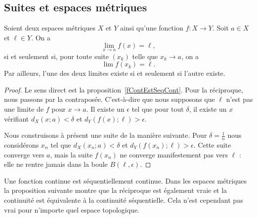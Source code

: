 \subsection{Suites et espaces métriques}


\begin{proposition}     \label{PROPooJYOOooZWocoq}
	Soient deux espaces métriques \( X\) et \( Y\) ainsi qu'une fonction \( f\colon X\to Y\). Soit \( a\in X\) et \( \ell\in Y\). On a
	\begin{equation}\label{EqLimooJYOOooZWocoqG}
		\lim_{x\to a} f(x)=\ell,
	\end{equation}
	si et seulement si, pour toute suite \( (x_k) \) telle que \( x_k \to a \), on a
	\begin{equation}\label{EqLimooJYOOooZWocoqS}
		\lim f(x_k)=\ell.
	\end{equation}
	Par ailleurs, l'une des deux limites existe si et seulement si l'autre existe.
\end{proposition}

\begin{proof}
	Le sens direct est la proposition~\ref{fContEstSeqCont}. Pour la réciproque, nous passons par la contraposée. C'est-à-dire que nous supposons que \( \ell\) n'est pas une limite de \( f\) pour \( x\to a\). Il existe un \( \epsilon\) tel que pour tout \( \delta\), il existe un \( x\) vérifiant \( d_X(x;a) <\delta\) et \( d_Y(f(x);\ell) >\epsilon\).

	Nous construisons à présent une suite de la manière suivante. Pour \( \delta=\frac{1}{ n }\) nous considérons \( x_n\) tel que \( d_X( x_n; a) <\delta\) et \( d_Y(f(x_n);\ell) > \epsilon \). Cette suite converge vers \( a\), mais la suite \( f(x_n)\) ne converge manifestement pas vers \( \ell\) : elle ne rentre jamais dans la boule \( B(\ell,\epsilon)\).
\end{proof}

Une fonction continue est séquentiellement continue. Dans les espaces métriques la proposition suivante montre que la réciproque est également vraie et la continuité est équivalente à la continuité séquentielle. Cela n'est cependant pas vrai pour n'importe quel espace topologique.

